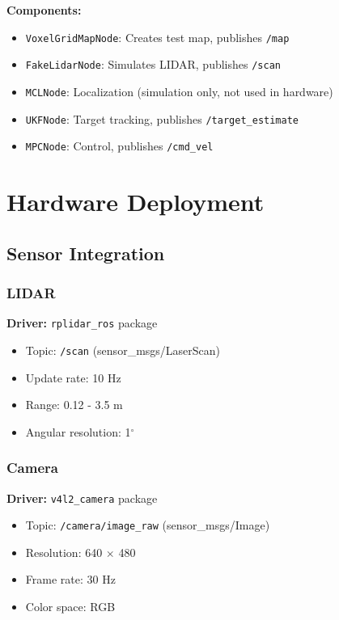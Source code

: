 \documentclass[11pt]{article}
\begin{document}
\textbf{Components:}
\begin{itemize}
    \item \texttt{VoxelGridMapNode}: Creates test map, publishes \texttt{/map}
    \item \texttt{FakeLidarNode}: Simulates LIDAR, publishes \texttt{/scan}
    \item \texttt{MCLNode}: Localization (simulation only, not used in hardware)
    \item \texttt{UKFNode}: Target tracking, publishes \texttt{/target\_estimate}
    \item \texttt{MPCNode}: Control, publishes \texttt{/cmd\_vel}
\end{itemize}

\section{Hardware Deployment}

\subsection{Sensor Integration}

\subsubsection{LIDAR}

\textbf{Driver:} \texttt{rplidar\_ros} package
\begin{itemize}
    \item Topic: \texttt{/scan} (sensor\_msgs/LaserScan)
    \item Update rate: 10 Hz
    \item Range: 0.12 - 3.5 m
    \item Angular resolution: 1$^\circ$
\end{itemize}

\subsubsection{Camera}

\textbf{Driver:} \texttt{v4l2\_camera} package
\begin{itemize}
    \item Topic: \texttt{/camera/image\_raw} (sensor\_msgs/Image)
    \item Resolution: 640 $\times$ 480
    \item Frame rate: 30 Hz
    \item Color space: RGB
\end{itemize}
\end{document}
